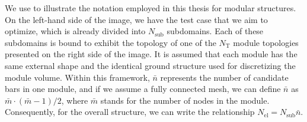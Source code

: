 We use  to illustrate the notation employed in this thesis for modular structures. On the left-hand side of the image, we have the test case that we aim to optimize, which is already divided into $N_\text{sub}$ subdomains. Each of these subdomains is bound to exhibit the topology of one of the $N_\text{T}$ module topologies presented on the right side of the image. It is assumed that each module has the same external shape and the identical ground structure used for discretizing the module volume. Within this framework, $\bar{n}$ represents the number of candidate bars in one module, and if we assume a fully connected mesh, we can define $\bar{n}$ as $\bar{m} \cdot (\bar{m}-1)/2$, where $\bar{m}$ stands for the number of nodes in the module. Consequently, for the overall structure, we can write the relationship $N_{\text{el}} = N_{\text{sub}}\bar{n}$.

